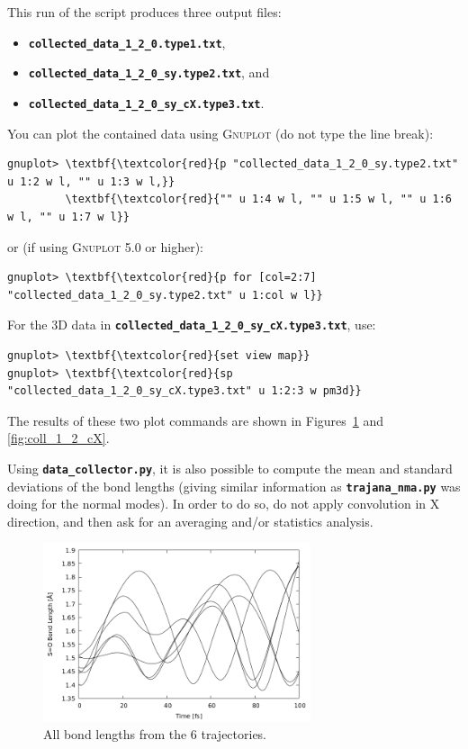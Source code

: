 \documentclass[a4paper,11pt,DIV=15,openany]{scrbook}
\newcommand{\ttt}[1]{\textbf{\texttt{#1}}}
\begin{document}
\normalsize
This run of the script produces three output files:
\begin{itemize}
  \item \ttt{collected\_data\_1\_2\_0.type1.txt},
  \item \ttt{collected\_data\_1\_2\_0\_sy.type2.txt}, and
  \item \ttt{collected\_data\_1\_2\_0\_sy\_cX.type3.txt}.
\end{itemize}
You can plot the contained data using \textsc{Gnuplot} (do not type the line break):
\begin{Verbatim}[commandchars=\\\{\}]
gnuplot> \textbf{\textcolor{red}{p "collected_data_1_2_0_sy.type2.txt" u 1:2 w l, "" u 1:3 w l,}}
         \textbf{\textcolor{red}{"" u 1:4 w l, "" u 1:5 w l, "" u 1:6 w l, "" u 1:7 w l}}
\end{Verbatim}
or (if using \textsc{Gnuplot} 5.0 or higher):
\begin{Verbatim}[commandchars=\\\{\}]
gnuplot> \textbf{\textcolor{red}{p for [col=2:7] "collected_data_1_2_0_sy.type2.txt" u 1:col w l}}
\end{Verbatim}
For the 3D data in \ttt{collected\_data\_1\_2\_0\_sy\_cX.type3.txt}, use:
\begin{Verbatim}[commandchars=\\\{\}]
gnuplot> \textbf{\textcolor{red}{set view map}}
gnuplot> \textbf{\textcolor{red}{sp "collected_data_1_2_0_sy_cX.type3.txt" u 1:2:3 w pm3d}}
\end{Verbatim}
The results of these two plot commands are shown in Figures~\ref{fig:coll_1_2} and \ref{fig:coll_1_2_cX}.

Using \ttt{data\_collector.py}, it is also possible to compute the mean and standard deviations of the bond lengths (giving similar information as \ttt{trajana\_nma.py} was doing for the normal modes).
In order to do so, do not apply convolution in X direction, and then ask for an averaging and/or statistics analysis.


\begin{figure}[p]
  \centering
  \includegraphics[width=0.7\textwidth]{figures/coll_1_2.png}
  \caption{All  bond lengths from the 6 trajectories.}
  \label{fig:coll_1_2}
\end{figure}
\end{document}
